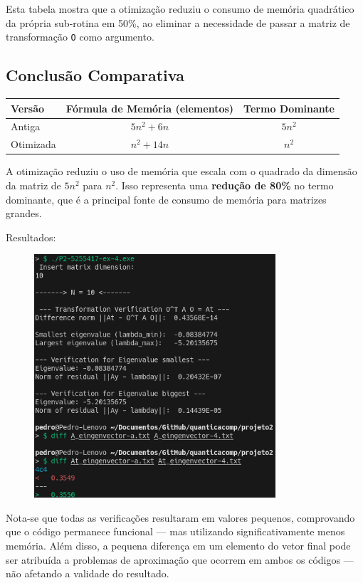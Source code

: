 \documentclass[12pt, a4paper]{article} %
\begin{document}
                Esta tabela mostra que a otimiza\c{c}\~ao reduziu o consumo de mem\'oria quadr\'atico da pr\'opria sub-rotina em 50\%, ao eliminar a necessidade de passar a matriz de transforma\c{c}\~ao \texttt{O} como argumento.

            \subsection*{Conclus\~ao Comparativa}

            \begin{table}[h!]
            \centering
            \begin{tabular}{|l|c|c|}
            \hline
            \textbf{Vers\~ao} & \textbf{F\'ormula de Mem\'oria (elementos)} & \textbf{Termo Dominante} \\
            \hline
            Antiga & $5n^2 + 6n$ & $5n^2$ \\
            Otimizada & $n^2 + 14n$ & $n^2$ \\
            \hline
            \end{tabular}
            \end{table}

            A otimiza\c{c}\~ao reduziu o uso de mem\'oria que escala com o quadrado da dimens\~ao da matriz de $5n^2$ para $n^2$. Isso representa uma \textbf{redu\c{c}\~ao de 80\%} no termo dominante, que \'e a principal fonte de consumo de mem\'oria para matrizes grandes.

        Resultados:
        \begin{figure}[H]
            \centering
            \includegraphics[width=0.8\textwidth]{../images/ex4.png}
        \end{figure}

        Nota-se que todas as verifica\c{c}\~oes resultaram em valores pequenos, comprovando que o c\'odigo permanece funcional ---  mas utilizando significativamente menos mem\'oria. Al\'em disso, a pequena diferen\c{c}a em um elemento do vetor final pode ser atribu\'ida a problemas de aproxima\c{c}\~ao que ocorrem em ambos os c\'odigos --- n\~ao afetando a validade do resultado.
\end{document}
